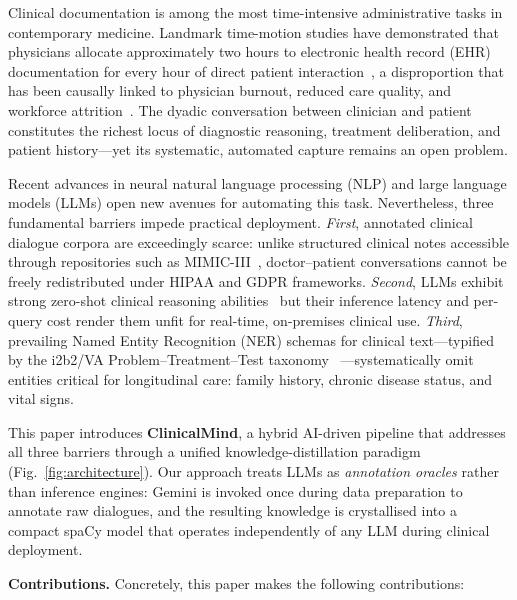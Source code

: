 \documentclass[conference]{IEEEtran}
\begin{document}
Clinical documentation is among the most time-intensive
administrative tasks in contemporary medicine. Landmark time-motion studies
have demonstrated that physicians allocate approximately two hours to
electronic health record (EHR) documentation for every hour of direct patient
interaction~\cite{sinsky2016allocation}, a disproportion that has been
causally linked to physician burnout, reduced care quality, and workforce
attrition~\cite{shanafelt2022changes}. The dyadic conversation between
clinician and patient constitutes the richest locus of diagnostic reasoning,
treatment deliberation, and patient history—yet its systematic, automated
capture remains an open problem.

Recent advances in neural natural language processing (NLP) and large language
models (LLMs) open new avenues for automating this task. Nevertheless, three
fundamental barriers impede practical deployment. \emph{First}, annotated
clinical dialogue corpora are exceedingly scarce: unlike structured clinical
notes accessible through repositories such as MIMIC-III~\cite{johnson2016mimic},
doctor–patient conversations cannot be freely redistributed under HIPAA and
GDPR frameworks. \emph{Second}, LLMs exhibit strong zero-shot clinical reasoning
abilities~\cite{singhal2023large} but their inference latency and per-query
cost render them unfit for real-time, on-premises clinical use.
\emph{Third}, prevailing Named Entity Recognition (NER) schemas for clinical
text—typified by the i2b2/VA Problem–Treatment–Test taxonomy~\cite{uzuner2011}
—systematically omit entities critical for longitudinal care: family history,
chronic disease status, and vital signs.

This paper introduces \textbf{ClinicalMind}, a hybrid AI-driven pipeline
that addresses all three barriers through a unified knowledge-distillation
paradigm (Fig.~\ref{fig:architecture}). Our approach treats LLMs as
\emph{annotation oracles} rather than inference engines: Gemini is invoked
once during data preparation to annotate raw dialogues, and the resulting
knowledge is crystallised into a compact spaCy model that operates
independently of any LLM during clinical deployment.

\textbf{Contributions.} Concretely, this paper makes the following
contributions:
\end{document}
